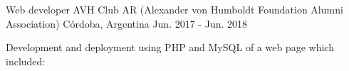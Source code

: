 \documentclass[11pt, a4paper]{resume}
\begin{document}
\begin{cventries}
  \cventry
    {Web developer}
    {AVH Club AR (Alexander von Humboldt Foundation Alumni Association)}
    {Córdoba, Argentina}
    {Jun. 2017 - Jun. 2018}
    {
      \begin{cvitems}
        \item {Development and deployment using PHP and MySQL of a web page which included:}
      \end{cvitems}
    }

\end{cventries}

\newpage

\end{document}
